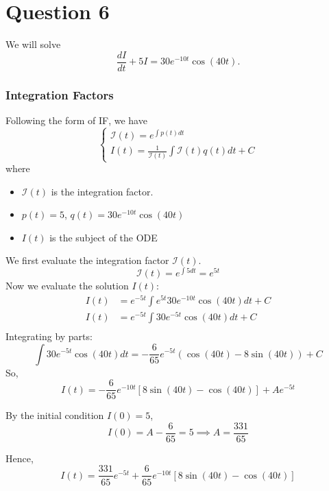 \documentclass[12pt,a4paper]{article}
\begin{document}
\section*{Question 6}
\begin{solution}
\end{solution}
We will solve
\begin{equation}\label{w8:eq}
    \frac{dI}{dt} +5I=30e^{-10t}\cos( 40t).
\end{equation}
\subsubsection*{Integration Factors}
Following the form of IF, we have
\[
\begin{cases}
    \mathcal{I}(t) = e^{\int p(t)dt}\\
    I(t) = \frac{1}{\mathcal{I}(t)} \int \mathcal{I}(t)q(t)dt + C
\end{cases}
\]
where
\begin{itemize}
    \item $\mathcal{I}(t)$ is the integration factor.
    \item $p(t) = 5$, $q(t) = 30e^{-10t}\cos(40t)$
    \item $I(t)$ is the subject of the ODE
\end{itemize}
We first evaluate the integration factor $\mathcal{I}(t)$.
\[
\mathcal{I}(t) = e^{\int 5dt} = e^{5t}
\]
Now we evaluate the solution $I(t)$:
$$\begin{aligned}
    I(t) &= e^{-5t}\int e^{5t}30e^{-10t}\cos(40t) dt + C\\
    I(t) &= e^{-5t}\int 30e^{-5t}\cos(40t) dt + C\\
\end{aligned}$$
Integrating by parts:
\[
\int 30e^{-5t}\cos(40t) dt = -\frac{6}{65} e^{-5 t}(\cos (40 t)-8 \sin (40 t)) + C
\]
So,
\[
I(t) = -\frac{6}{65} e^{-10 t}[8 \sin (40 t)-\cos (40 t)]+A e^{-5 t}
\]

By the initial condition $I(0) = 5$,
\[
I(0) = A-\frac{6}{65} = 5\implies A = \frac{331}{65} 
\]

Hence,
\begin{equation}\label{w8:conc1}
I(t) = \frac{331}{65} e^{-5 t}+ \frac{6}{65} e^{-10 t}[8 \sin (40 t)-\cos (40 t)]
\end{equation}
\end{document}
